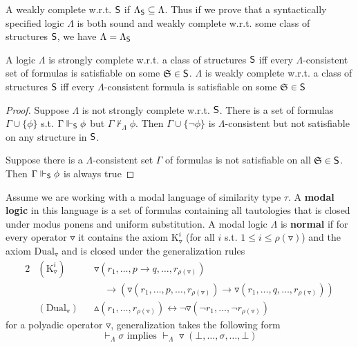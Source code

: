 \documentclass[11pt]{article}
\begin{document}
A weakly complete w.r.t. \(\textsf{S}\) if \(\Lambda_{\textsf{S}}\subseteq\Lambda\). Thus
if we prove that a syntactically specified logic \(\Lambda\) is both sound and weakly
complete w.r.t. some class of structures \(\textsf{S}\), we have \(\Lambda=\Lambda_{\textsf{S}}\)

\begin{proposition}[]
\label{prop4.12}
A logic \(\Lambda\) is strongly complete w.r.t. a class of structures \(\textsf{S}\) iff
every \(\Lambda\)-consistent set of formulas is satisfiable on some
\(\mathfrak{S}\in\textsf{S}\). \(\Lambda\) is weakly complete w.r.t. a class of structures \(\textsf{S}\)
iff every \(\Lambda\)-consistent formula is satisfiable on some \(\mathfrak{S}\in\textsf{S}\)
\end{proposition}

\begin{proof}
Suppose \(\Lambda\) is not strongly complete w.r.t. \(\textsf{S}\). There is a set of
formulas \(\Gamma\cup\{\phi\}\) s.t. \(\Gamma\Vdash_{\textsf{S}}\phi\) but
\(\Gamma\not\vdash_\Lambda\phi\).  Then \(\Gamma\cup\{\neg\phi\}\) is
\(\Lambda\)-consistent but not satisfiable on any structure in \(\textsf{S}\).

Suppose there is a \(\Lambda\)-consistent set \(\Gamma\) of formulas is not
satisfiable on all \(\mathfrak{S}\in\textsf{S}\). Then \(\Gamma\Vdash_{\textsf{S}}\phi\) is always true
\end{proof}

\begin{definition}[]
Assume we are working with a modal language of similarity type \(\tau\). A \textbf{modal
logic} in this language is a set of formulas containing all tautologies that
is closed under modus ponens and uniform substitution. A modal logic \(\Lambda\) is
\textbf{normal} if for every operator \(\triangledown\) it contains the axiom
\(\text{K}_{\triangledown}^i\) (for all \(i\) s.t. \(1\le
   i\le\rho(\triangledown)\)) and the axiom \(\text{Dual}_{\triangledown}\) and
is closed under the generalization rules
\begin{alignat*}{2}
&(\text{K}_{\triangledown}^i)&&
\triangledown(r_1,\dots,p\to q,\dots,r_{\rho(\triangledown)})\\
&&&\quad\to(\triangledown(r_1,\dots,p,\dots,r_{\rho(\triangledown)})
\to\triangledown(r_1,\dots,q,\dots,r_{\rho(\triangledown)}))\\
&(\text{Dual}_{\triangledown})&&\vartriangle(r_1,\dots,r_{\rho(\triangledown)})
\leftrightarrow\neg\triangledown(\neg r_1,\dots,\neg r_{\rho(\triangledown)})
\end{alignat*}
for a polyadic operator \(\triangledown\), generalization takes the following
form
\begin{equation*}
\vdash_{\Lambda}\sigma\text{ implies }\vdash_{\Lambda}\triangledown(\bot,\dots,\sigma,\dots,\bot)
\end{equation*}
\end{definition}
\end{document}
